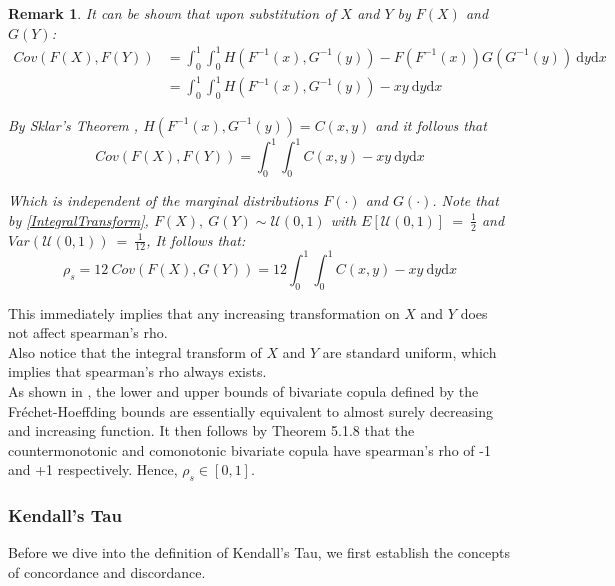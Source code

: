 \documentclass[12pt]{report}
\newtheorem{remark}{Remark}[section]
\newcommand{\1}{\mathbf{1}}
\begin{document}
\begin{flushleft}
\begin{remark}
It can be shown that upon substitution of $X$ and $Y$ by $F(X)$ and $G(Y)$: 
\begin{align*}
Cov(F(X),F(Y)) &= \int_{0}^{1} \int_{0}^{1} H(F^{-1}(x),G^{-1}(y)) - F(F^{-1}(x))G(G^{-1}(y)) \: \mathrm{d}y\mathrm{d}x \\
&= \int_{0}^{1} \int_{0}^{1} H(F^{-1}(x),G^{-1}(y)) - xy \: \mathrm{d}y\mathrm{d}x
\end{align*}

By Sklar's Theorem \parencite{SklarTheorem}, $H(F^{-1}(x),G^{-1}(y)) = C(x,y)$ and it follows that 
\begin{equation*}
Cov(F(X),F(Y)) = \int_{0}^{1} \int_{0}^{1} C(x,y) - xy \: \mathrm{d}y\mathrm{d}x
\end{equation*}

Which is independent of the marginal distributions $F(\cdot)$ and $G(\cdot)$. Note that by \ref{IntegralTransform}, $F(X), \: G(Y) \sim \mathcal{U}(0,1)$ with $E[\mathcal{U}(0,1)] \: = \: \frac{1}{2}$ and $Var(\mathcal{U}(0,1)) \: = \: \frac{1}{12}$, It follows that:
\begin{equation*}
\rho_{s} = 12 \: Cov(F(X),G(Y)) = 12 \int_{0}^{1} \int_{0}^{1} C(x,y) - xy \: \mathrm{d}y\mathrm{d}x
\end{equation*}
\end{remark} 
This immediately implies that any increasing transformation on $X$ and $Y$ does not affect spearman's rho.\\
\vspace{0.5cm}
Also notice that the integral transform of $X$ and $Y$ are standard uniform, which implies that spearman's rho always exists.\\
\vspace{0.5cm}
As shown in \cite{HofertBook}, the lower and upper bounds of bivariate copula defined by the Fr{\'e}chet-Hoeffding bounds are essentially equivalent to almost surely decreasing and increasing function. It then follows by \cite{NelsenCopulabook2006} Theorem 5.1.8 that the countermonotonic and comonotonic bivariate copula have spearman's rho of -1 and +1 respectively. Hence, $\rho_{s} \in [0,1]$.

\subsubsection{Kendall's Tau}
\vspace{0.5cm}
Before we dive into the definition of Kendall's Tau, we first establish the concepts of concordance and discordance.


\end{flushleft}
\end{document}
